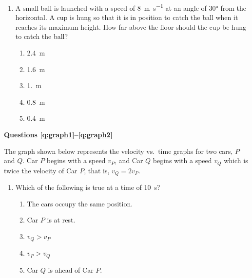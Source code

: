 \documentclass{../../../oss-apphys}
\begin{document}
\begin{multicols}{2}
\begin{enumerate}[resume,leftmargin=18pt]
  \item A small ball is launched with a speed of \SI{8}{\metre\per\second} at
    an angle of \ang{30} from the horizontal. A cup is hung so that it is in
    position to catch the ball when it reaches its maximum height. How far
    above the floor should the cup be hung to catch the ball?
    \begin{enumerate}[nosep,leftmargin=18pt,label=(\Alph*)]
    \item\SI{2.4}{\metre}
    \item\SI{1.6}{\metre}
    \item\SI{1.}{\metre}
    \item\SI{.8}{\metre}
    \item\SI{.4}{\metre}
    \end{enumerate}
  \end{enumerate}
  \newpage
  
  \textbf{Questions \ref{q:graph1}--\ref{q:graph2}}

  The graph shown below represents the velocity vs.\ time graphs for two cars,
  $P$ and $Q$. Car $P$ begins with a speed $v_P$, and Car $Q$ begins with a
  speed $v_Q$ which is twice the velocity of Car $P$, that is, $v_Q=2v_P$.
  \begin{center}
  \end{center}
  \begin{enumerate}[resume,leftmargin=18pt]
  \item Which of the following is true at a time of \SI{10}{\second}?
    \begin{enumerate}[nosep,leftmargin=18pt,label=(\Alph*)]
    \item The cars occupy the same position.
    \item Car $P$ is at rest.
    \item $v_Q>v_P$
    \item $v_P>v_Q$
    \item Car $Q$ is ahead of Car $P$.
    \end{enumerate}
    \label{q:graph1}
    \vspace{.65in}
    

\end{enumerate}
\end{multicols}
\end{document}
